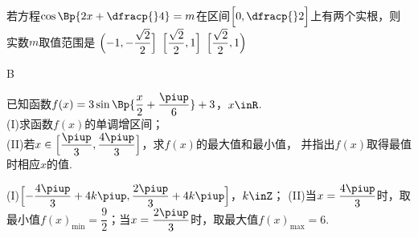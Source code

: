 \begin{exercise}
\begin{answer}
        \end{answer}
      \vspace{1.5em}
      \item%
        若方程$\cos\Bp{2x+\dfracp{}4}=m$在区间$\Bigl[0,\dfracp{}2\Bigr]$上有两个实根，则实数$m$取值范围是\xz
         {$\Bigl(-1,-\dfrac{\sqrt2}2\Bigr]$}
         {$\Bigl[\dfrac{\sqrt2}2,1\Bigr]$}
         {$\Bigl[\dfrac{\sqrt2}2,1\Bigr)$}
        \begin{answer}
          B
        \end{answer}
      \vspace{1.5em}
      \item%
        已知函数$f(x)=3\sin\Bp{\dfrac{x}2+\dfrac{\piup}6}+3$，$x\inR$.\\
        (I)求函数$f(x)$的单调增区间；\\
        (II)若$x\in\Bigl[\dfrac{\piup}3,\dfrac{4\piup}3\Bigr]$，求$f(x)$的最大值和最小值，
        并指出$f(x)$取得最值时相应$x$的值.
        \begin{answer}
          (I)$\Bigl[-\dfrac{4\piup}3+4k\piup,\dfrac{2\piup}3+4k\piup\Bigr]$，$k\inZ$；
          (II)当$x=\dfrac{4\piup}3$时，取最小值$f(x)_{\min}=\dfrac92$；当$x=\dfrac{2\piup}3$时，取最大值$f(x)_{\max}=6$.
        \end{answer}
      \vspace{5cm}
    \end{exercise}
